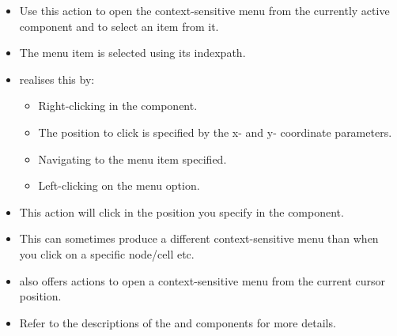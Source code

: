 \begin{itemize}
\item Use this action to open the context-sensitive menu from the currently active component and to select an item from it.
\item The menu item is selected using its indexpath. 
\item \jb{} realises this by:
\begin{itemize}
\item Right-clicking in the component.
\item The position to click is specified by the x- and y- coordinate parameters.
\item Navigating to the menu item specified.
\item Left-clicking on the menu option.  
\end{itemize}
\item This action will click in the position you specify in the component.
\item This can sometimes produce a different context-sensitive menu than when you click on a specific node/cell etc.
\item \jb{} also offers actions to open a context-sensitive menu from the current cursor position. 
\item Refer to the descriptions of the  and  components for more details. 

\end{itemize}


